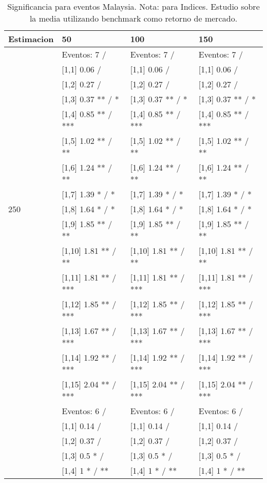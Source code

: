 \begin{table}

\caption{Significancia para eventos Malaysia. Nota: para Indices. Estudio sobre la media utilizando benchmark como retorno de mercado.}
\centering
\begin{tabular}[t]{llll}
\toprule
Estimacion & 50 & 100 & 150\\
\midrule
 & Eventos:  7 / & Eventos:  7 / & Eventos:  7 /\\
 & {}[1,1] 0.06  / & {}[1,1] 0.06  / & {}[1,1] 0.06  /\\
 & {}[1,2] 0.27  / & {}[1,2] 0.27  / & {}[1,2] 0.27  /\\
 & {}[1,3] 0.37 ** / * & {}[1,3] 0.37 ** / * & {}[1,3] 0.37 ** / *\\
 & {}[1,4] 0.85 ** / *** & {}[1,4] 0.85 ** / *** & {}[1,4] 0.85 ** / ***\\
\addlinespace
 & {}[1,5] 1.02 ** / ** & {}[1,5] 1.02 ** / ** & {}[1,5] 1.02 ** / **\\
 & {}[1,6] 1.24 ** / ** & {}[1,6] 1.24 ** / ** & {}[1,6] 1.24 ** / **\\
 & {}[1,7] 1.39 * / * & {}[1,7] 1.39 * / * & {}[1,7] 1.39 * / *\\
250 & {}[1,8] 1.64 * / * & {}[1,8] 1.64 * / * & {}[1,8] 1.64 * / *\\
 & {}[1,9] 1.85 ** / ** & {}[1,9] 1.85 ** / ** & {}[1,9] 1.85 ** / **\\
\addlinespace
 & {}[1,10] 1.81 ** / ** & {}[1,10] 1.81 ** / ** & {}[1,10] 1.81 ** / **\\
 & {}[1,11] 1.81 ** / *** & {}[1,11] 1.81 ** / *** & {}[1,11] 1.81 ** / ***\\
 & {}[1,12] 1.85 ** / *** & {}[1,12] 1.85 ** / *** & {}[1,12] 1.85 ** / ***\\
 & {}[1,13] 1.67 ** / *** & {}[1,13] 1.67 ** / *** & {}[1,13] 1.67 ** / ***\\
 & {}[1,14] 1.92 ** / *** & {}[1,14] 1.92 ** / *** & {}[1,14] 1.92 ** / ***\\
\addlinespace
 & {}[1,15] 2.04 ** / *** & {}[1,15] 2.04 ** / *** & {}[1,15] 2.04 ** / ***\\
 & Eventos:  6 / & Eventos:  6 / & Eventos:  6 /\\
 & {}[1,1] 0.14  / & {}[1,1] 0.14  / & {}[1,1] 0.14  /\\
 & {}[1,2] 0.37  / & {}[1,2] 0.37  / & {}[1,2] 0.37  /\\
 & {}[1,3] 0.5 * / & {}[1,3] 0.5 * / & {}[1,3] 0.5 * /\\
\addlinespace
 & {}[1,4] 1 * / ** & {}[1,4] 1 * / ** & {}[1,4] 1 * / **\\

\end{tabular}
\end{table}
